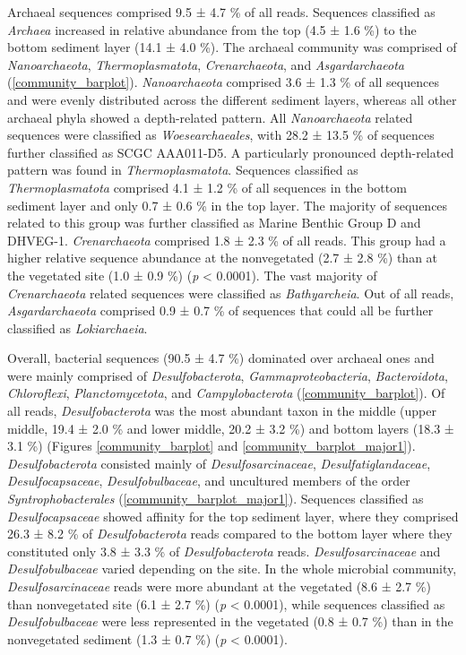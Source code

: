 \documentclass[12pt,]{article}
\begin{document}
Archaeal sequences comprised 9.5 ± 4.7 \si{\percent} of all reads.
Sequences classified as \emph{Archaea} increased in relative abundance
from the top (4.5 ± 1.6 \si{\percent}) to the bottom sediment layer
(14.1 ± 4.0 \si{\percent}). The archaeal community was comprised of
\emph{Nanoarchaeota}, \emph{Thermoplasmatota}, \emph{Crenarchaeota}, and
\emph{Asgardarchaeota} (\autoref{community_barplot}).
\emph{Nanoarchaeota} comprised 3.6 ± 1.3 \si{\percent} of all sequences
and were evenly distributed across the different sediment layers,
whereas all other archaeal phyla showed a depth-related pattern. All
\emph{Nanoarchaeota} related sequences were classified as
\emph{Woesearchaeales}, with 28.2 ± 13.5 \si{\percent} of sequences
further classified as SCGC AAA011-D5. A particularly pronounced
depth-related pattern was found in \emph{Thermoplasmatota}. Sequences
classified as \emph{Thermoplasmatota} comprised 4.1 ± 1.2 \si{\percent}
of all sequences in the bottom sediment layer and only 0.7 ± 0.6
\si{\percent} in the top layer. The majority of sequences related to
this group was further classified as Marine Benthic Group D and DHVEG-1.
\emph{Crenarchaeota} comprised 1.8 ± 2.3 \si{\percent} of all reads.
This group had a higher relative sequence abundance at the nonvegetated
(2.7 ± 2.8 \si{\percent}) than at the vegetated site (1.0 ± 0.9
\si{\percent}) (\emph{p} \textless{} 0.0001). The vast majority of
\emph{Crenarchaeota} related sequences were classified as
\emph{Bathyarcheia}. Out of all reads, \emph{Asgardarchaeota} comprised
0.9 ± 0.7 \si{\percent} of sequences that could all be further
classified as \emph{Lokiarchaeia}.

Overall, bacterial sequences (90.5 ± 4.7 \si{\percent}) dominated over
archaeal ones and were mainly comprised of \emph{Desulfobacterota},
\emph{Gammaproteobacteria}, \emph{Bacteroidota}, \emph{Chloroflexi},
\emph{Planctomycetota}, and \emph{Campylobacterota}
(\autoref{community_barplot}). Of all reads, \emph{Desulfobacterota} was
the most abundant taxon in the middle (upper middle, 19.4 ± 2.0
\si{\percent} and lower middle, 20.2 ± 3.2 \si{\percent}) and bottom
layers (18.3 ± 3.1 \si{\percent}) (Figures \ref{community_barplot} and
\ref{community_barplot_major1}). \emph{Desulfobacterota} consisted
mainly of \emph{Desulfosarcinaceae}, \emph{Desulfatiglandaceae},
\emph{Desulfocapsaceae}, \emph{Desulfobulbaceae}, and uncultured members
of the order \emph{Syntrophobacterales}
(\autoref{community_barplot_major1}). Sequences classified as
\emph{Desulfocapsaceae} showed affinity for the top sediment layer,
where they comprised 26.3 ± 8.2 \si{\percent} of \emph{Desulfobacterota}
reads compared to the bottom layer where they constituted only 3.8 ± 3.3
\si{\percent} of \emph{Desulfobacterota} reads.
\emph{Desulfosarcinaceae} and \emph{Desulfobulbaceae} varied depending
on the site. In the whole microbial community, \emph{Desulfosarcinaceae}
reads were more abundant at the vegetated (8.6 ± 2.7 \si{\percent}) than
nonvegetated site (6.1 ± 2.7 \si{\percent}) (\emph{p} \textless{}
0.0001), while sequences classified as \emph{Desulfobulbaceae} were less
represented in the vegetated (0.8 ± 0.7 \si{\percent}) than in the
nonvegetated sediment (1.3 ± 0.7 \si{\percent}) (\emph{p} \textless{}
0.0001).
\end{document}
